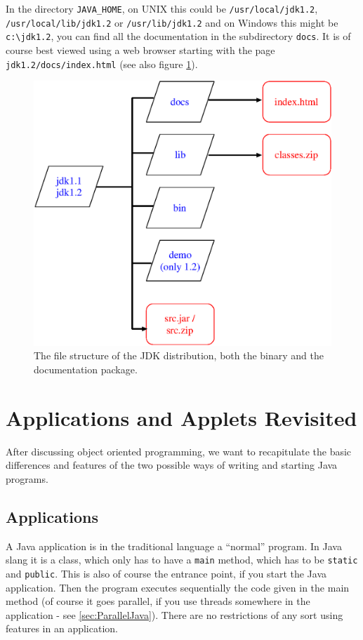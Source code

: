 In the directory \verb|JAVA_HOME|, on UNIX this could be 
\verb|/usr/local/jdk1.2|, \verb|/usr/local/lib/jdk1.2| or 
\verb|/usr/lib/jdk1.2| and on Windows this might be \verb|c:\jdk1.2|, 
you can find all the documentation in the subdirectory
\verb|docs|. It is of course best viewed using a web browser
starting with the page \verb|jdk1.2/docs/index.html| 
(see also figure \ref{fig:JDKFiles}).
\begin{figure}[htbp]
  \begin{center}
    \includegraphics[width=.6\textwidth]{Figures/JDKDocumentation.eps}
    \caption{The file structure of the JDK distribution, both the binary and the documentation package.}
    \label{fig:JDKFiles}
  \end{center}
\end{figure}


\section{Applications and Applets Revisited}

After discussing object oriented programming,
we want to recapitulate the basic differences and features of
the two possible ways of writing and starting Java programs.

\subsection{Applications}
A Java application is in the traditional language a ``normal'' program.
In Java slang it is a class, which only has to have a \verb|main|
method, which has to be \verb|static| and \verb|public|. This is also of course the
entrance point, if you start the Java application. Then the program
executes sequentially the code given in the main method (of course it
goes parallel, if you use threads somewhere in the application - see
\ref{sec:ParallelJava}). There are no restrictions of any sort using
features in an application.


